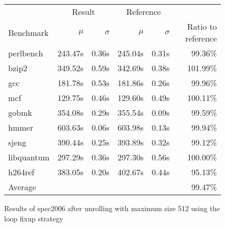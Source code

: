 \begin{figure}[h]
    \begin{center}
        \begin{tabular}{lrrrrr}
            \toprule
            & \multicolumn{2}{c}{Result} & \multicolumn{2}{c}{Reference}\\
            Benchmark & $\mu$ & $\sigma$ & $\mu$ & $\sigma$ & Ratio to reference\\
            \midrule
            perlbench & 243.47s & 0.36s & 245.04s & 0.31s & 99.36\%\\
            bzip2 & 349.52s & 0.59s & 342.69s & 0.38s & 101.99\%\\
            gcc & 181.78s & 0.53s & 181.86s & 0.26s & 99.96\%\\
            mcf & 129.75s & 0.46s & 129.60s & 0.49s & 100.11\%\\
            gobmk & 354.08s & 0.29s & 355.54s & 0.09s & 99.59\%\\
            hmmer & 603.63s & 0.06s & 603.98s & 0.13s & 99.94\%\\
            sjeng & 390.44s & 0.25s & 393.89s & 0.32s & 99.12\%\\
            libquantum & 297.29s & 0.36s & 297.30s & 0.56s & 100.00\%\\
            h264ref & 383.05s & 0.20s & 402.67s & 0.44s & 95.13\%\\
            \midrule
            Average & & & & & 99.47\%\\
            \bottomrule
        \end{tabular}
    \end{center}
    \caption{Results of spec2006 after unrolling with maximum size 512 using the loop fixup strategy}
    \label{fig:eval:perf:loop:512}
\end{figure}
